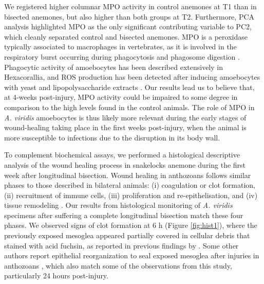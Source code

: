 \documentclass[final,3p,times,authoryear]{elsarticle}
\begin{document}
We registered higher columnar MPO activity in control anemones at T1 than in bisected anemones, but also higher than both groups at T2. Furthermore, PCA analysis highlighted MPO as the only significant contributing variable to PC2, which cleanly separated control and bisected anemones. MPO is a peroxidase typically associated to macrophages in vertebrates, as it is involved in the respiratory burst occurring during phagocytosis and phagosome digestion \citep{Klebanoff2005, Lin2024}. Phagocytic activity of amoebocytes has been described extensively in Hexacorallia, and ROS production has been detected after inducing amoebocytes with yeast and lipopolysaccharide extracts \citep{Hutton1996, Olano2000, Snyder2021, Fabrello2023}. Our results lead us to believe that, at 4-weeks post-injury, MPO  activity could be impaired to some degree in comparison to the high levels found in the control animals. The role of MPO in \textit{A. viridis} amoebocytes is thus likely more relevant during the early stages of wound-healing taking place in the first weeks post-injury, when the animal is more susceptible to infections due to the disruption in its body wall.

To complement biochemical assays, we performed a histological descriptive analysis of the wound healing process in snakelocks anemone during the first week after longitudinal bisection. Wound healing in anthozoans follows similar phases to those described in bilateral animals: (i) coagulation or clot formation, (ii) recruitment of immune cells, (iii) proliferation and re-epithelisation, and (iv) tissue remodeling \citep{Palmer2011, Parisi2021, LaCorte2023}. Our results from histological monitoring of \textit{A. viridis} specimens after suffering a complete longitudinal bisection match these four phases. We observed signs of clot formation at 6 h (Figure \ref{fig:hist1}), where the previously exposed mesoglea appeared partially covered in cellular debris that stained with acid fuchsin, as reported in previous findings by \citet{Palmer2011, LaCorte2023}. Some other authors report epithelial reorganization to seal exposed mesoglea after injuries in anthozoans \citep{Meszaros1999}, which also match some of the observations from this study, particularly 24 hours post-injury.
\end{document}
